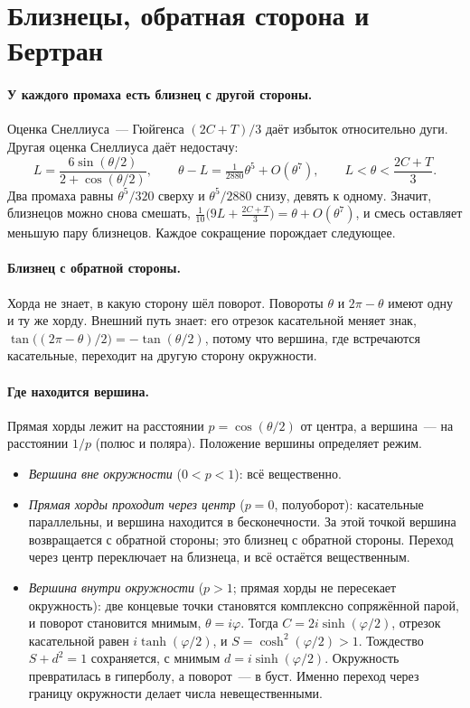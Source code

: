 \section{Близнецы, обратная сторона и Бертран}\label{sec:twins}

\paragraph{У каждого промаха есть близнец с другой стороны.} Оценка Снеллиуса~--- Гюйгенса
$(2C+T)/3$ даёт избыток относительно дуги. Другая оценка Снеллиуса даёт недостачу:
\[
L=\frac{6\sin(\theta/2)}{2+\cos(\theta/2)},\qquad
\theta-L=\tfrac{1}{2880}\theta^5+O(\theta^7),\qquad L<\theta<\frac{2C+T}{3}.
\]
Два промаха равны $\theta^5/320$ сверху и $\theta^5/2880$ снизу, девять к одному. Значит, близнецов
можно снова смешать, $\tfrac{1}{10}\bigl(9L+\tfrac{2C+T}{3}\bigr)=\theta+O(\theta^7)$, и
смесь оставляет меньшую пару близнецов. Каждое сокращение порождает следующее.

\paragraph{Близнец с обратной стороны.} Хорда не знает, в какую сторону шёл поворот.
Повороты $\theta$ и $2\pi-\theta$ имеют одну и ту же хорду. Внешний путь знает: его
отрезок касательной меняет знак, $\tan\bigl((2\pi-\theta)/2\bigr)=-\tan(\theta/2)$, потому что
вершина, где встречаются касательные, переходит на другую сторону окружности.

\paragraph{Где находится вершина.} Прямая хорды лежит на расстоянии $p=\cos(\theta/2)$
от центра, а вершина~--- на расстоянии $1/p$ (полюс и поляра). Положение вершины
определяет режим.
\begin{itemize}
  \item \emph{Вершина вне окружности} ($0<p<1$): всё вещественно.
  \item \emph{Прямая хорды проходит через центр} ($p=0$, полуоборот): касательные
    параллельны, и вершина находится в бесконечности. За этой точкой вершина возвращается с обратной стороны;
    это близнец с обратной стороны. Переход через центр переключает на близнеца, и всё остаётся вещественным.
  \item \emph{Вершина внутри окружности} ($p>1$; прямая хорды не пересекает окружность):
    две концевые точки становятся комплексно сопряжённой парой, и поворот становится мнимым,
    $\theta=i\varphi$. Тогда $C=2i\sinh(\varphi/2)$, отрезок касательной равен $i\tanh(\varphi/2)$, и
    $S=\cosh^2(\varphi/2)>1$. Тождество $S+d^2=1$ сохраняется, с мнимым $d=i\sinh(\varphi/2)$.
    Окружность превратилась в гиперболу, а поворот~--- в буст. Именно переход через границу окружности
    делает числа невещественными.
\end{itemize}

